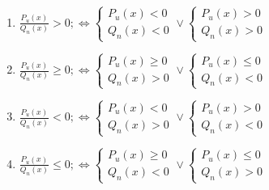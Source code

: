 \documentclass[12pt]{report}
\begin{document}
\begin{center}
  \begin{varwidth}{\textwidth}
    \begin{enumerate}[label=\Roman*.]
      \item 
        $\frac{P_u(x)}{Q_n(x)} > 0 ;
        \Leftrightarrow
        \left\{ 
          \begin{array}{rcl}
            P_u(x) < 0 \\
            Q_n(x) < 0
          \end{array}
        \right.
        \vee
        \left\{ 
          \begin{array}{rcl}
          P_u(x) > 0 \\
          Q_n(x) > 0
          \end{array}
        \right.$ \vspace{2mm}

      \item 
        $\frac{P_u(x)}{Q_n(x)} \ge 0 ;
        \Leftrightarrow
        \left\{ 
          \begin{array}{rcl}
            P_u(x) \ge 0 \\
            Q_n(x) > 0
          \end{array}
        \right.
        \vee
        \left\{ 
          \begin{array}{rcl}
          P_u(x) \le 0 \\
          Q_n(x) < 0
          \end{array}
        \right.$ \vspace{2mm}

      \item 
        $\frac{P_u(x)}{Q_n(x)} < 0 ;
        \Leftrightarrow
        \left\{ 
          \begin{array}{rcl}
            P_u(x) < 0 \\
            Q_n(x) > 0
          \end{array}
        \right.
        \vee
        \left\{ 
          \begin{array}{rcl}
          P_u(x) > 0 \\
          Q_n(x) < 0
          \end{array}
        \right.$ \vspace{2mm}

      \item 
        $\frac{P_u(x)}{Q_n(x)} \le 0 ;
        \Leftrightarrow
        \left\{ 
          \begin{array}{rcl}
            P_u(x) \ge 0 \\
            Q_n(x) < 0
          \end{array}
        \right.
        \vee
        \left\{ 
          \begin{array}{rcl}
          P_u(x) \le 0 \\
          Q_n(x) > 0
          \end{array}
        \right.$ \vspace{2mm}


    \end{enumerate}
  \end{varwidth}
\end{center}

\newpage
\end{document}
